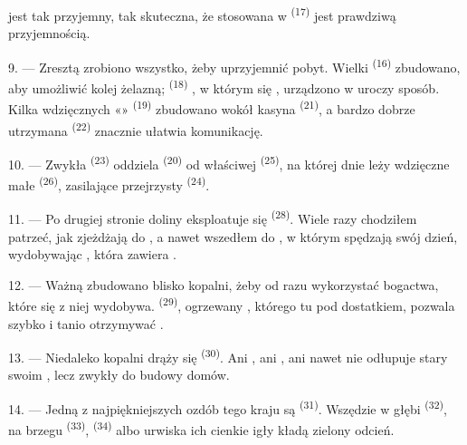  jest tak przyjemny,  tak skuteczna, że
 stosowana w  \textsuperscript{(17)} jest prawdziwą
przyjemnością.

\VUsaut{3.0mm}
\VUsaut{3.0mm}

9. --- Zresztą zrobiono wszystko, żeby uprzyjemnić pobyt. Wielki 
\textsuperscript{(16)} zbudowano, aby umożliwić kolej żelazną; 
\textsuperscript{(18)} , w którym się ,
urządzono w uroczy sposób. Kilka wdzięcznych «» \textsuperscript{(19)}
zbudowano wokół kasyna \textsuperscript{(21)}, a bardzo dobrze utrzymana 
\textsuperscript{(22)} znacznie ułatwia komunikację.

10. --- Zwykła  \textsuperscript{(23)} oddziela 
\textsuperscript{(20)} od właściwej  \textsuperscript{(25)}, na której dnie
leży wdzięczne małe  \textsuperscript{(26)}, zasilające przejrzysty
 \textsuperscript{(24)}.

11. --- Po drugiej stronie doliny eksploatuje się 
\textsuperscript{(28)}. Wiele razy chodziłem patrzeć, jak  zjeżdżają do
, a nawet wszedłem do , w którym spędzają swój dzień,
wydobywając , która zawiera .

12. --- Ważną  zbudowano blisko kopalni, żeby od razu wykorzystać bogactwa,
które się z niej wydobywa.  \textsuperscript{(29)}, ogrzewany
, którego tu pod dostatkiem, pozwala szybko i tanio otrzymywać
.

13. --- Niedaleko kopalni drąży się  \textsuperscript{(30)}. Ani
, ani , ani nawet  nie odłupuje stary
 swoim , lecz zwykły  do budowy
domów.

14. --- Jedną z najpiękniejszych ozdób tego kraju są 
\textsuperscript{(31)}. Wszędzie w głębi  \textsuperscript{(32)}, na brzegu
 \textsuperscript{(33)},  \textsuperscript{(34)} albo
urwiska ich cienkie igły kładą zielony odcień.

